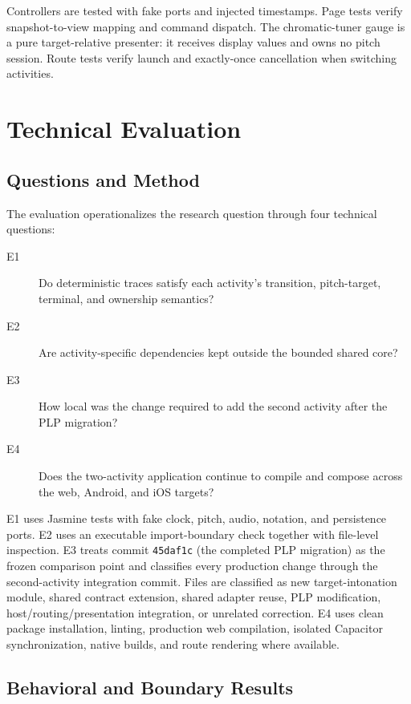 \documentclass[runningheads]{llncs}
\begin{document}
Controllers are tested with fake ports and injected timestamps. Page tests
verify snapshot-to-view mapping and command dispatch. The chromatic-tuner gauge
is a pure target-relative presenter: it receives display values and owns no
pitch session. Route tests verify launch and exactly-once cancellation when
switching activities.

\section{Technical Evaluation}\label{sec:evaluation}

\subsection{Questions and Method}

The evaluation operationalizes the research question through four technical
questions:
\begin{description}
\item[E1] Do deterministic traces satisfy each activity's transition,
pitch-target, terminal, and ownership semantics?
\item[E2] Are activity-specific dependencies kept outside the bounded shared
core?
\item[E3] How local was the change required to add the second activity after
the PLP migration?
\item[E4] Does the two-activity application continue to compile and compose
across the web, Android, and iOS targets?
\end{description}

E1 uses Jasmine tests with fake clock, pitch, audio, notation, and persistence
ports. E2 uses an executable import-boundary check together with file-level
inspection. E3 treats commit \texttt{45daf1c} (the completed PLP migration) as
the frozen comparison point and classifies every production change through the
second-activity integration commit. Files are classified as new
target-intonation module, shared contract extension, shared adapter reuse, PLP
modification, host/routing/presentation integration, or unrelated correction.
E4 uses clean package installation, linting, production web compilation,
isolated Capacitor synchronization, native builds, and route rendering where
available.

\subsection{Behavioral and Boundary Results}
\end{document}
